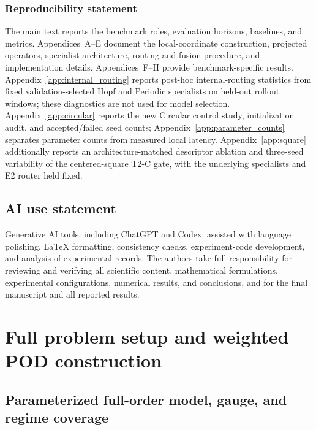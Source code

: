 \documentclass{article}
\begin{document}
\subsubsection*{Reproducibility statement}
The main text reports the benchmark roles, evaluation horizons, baselines, and metrics. Appendices~A--E document the local-coordinate construction, projected operators, specialist architecture, routing and fusion procedure, and implementation details. Appendices~F--H provide benchmark-specific results.
Appendix~\ref{app:internal_routing} reports post-hoc internal-routing statistics
from fixed validation-selected Hopf and Periodic specialists on held-out
rollout windows; these diagnostics are not used for model selection.
Appendix~\ref{app:circular} reports the new Circular control study, initialization audit, and accepted/failed seed counts; Appendix~\ref{app:parameter_counts} separates parameter counts from measured local latency.
Appendix~\ref{app:square} additionally reports an architecture-matched descriptor
ablation and three-seed variability of the centered-square T2-C gate, with the
underlying specialists and E2 router held fixed.

\subsection*{AI use statement}
Generative AI tools, including ChatGPT and Codex, assisted with language polishing, LaTeX formatting, consistency checks, experiment-code development, and analysis of experimental records. The authors take full responsibility for reviewing and verifying all scientific
content, mathematical formulations, experimental configurations, numerical
results, and conclusions, and for the final manuscript and all reported results.




\appendix
\section{Full problem setup and weighted POD construction}
\label{app:problem_pod}

\subsection{Parameterized full-order model, gauge, and regime coverage}
\end{document}

